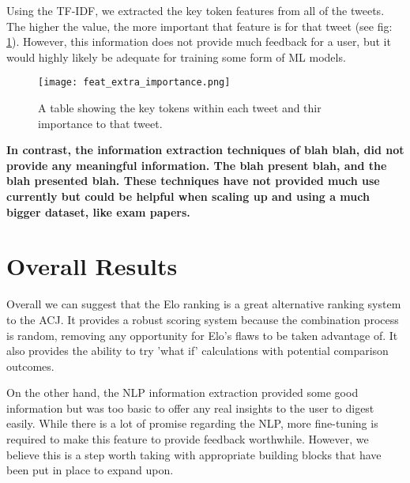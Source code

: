 	Using the TF-IDF, we extracted the key token features from all of the tweets. The higher the value, the more important that feature is for that tweet (see fig: \ref{fig:feature_extract}). However, this information does not provide much feedback for a user, but it would highly likely be adequate for training some form of ML models.

	\begin{figure}[h]
		\centering
		\texttt{[image: feat\_extra\_importance.png]}
		\caption{A table showing the key tokens within each tweet and thir importance to that tweet.}
		\label{fig:feature_extract}
		
	\end{figure}

	\textbf{In contrast, the information extraction techniques of blah blah, did not provide any meaningful information. The blah present blah, and the blah presented blah. These techniques have not provided much use currently but could be helpful when scaling up and using a much bigger dataset, like exam papers.}



\section{Overall Results}
\label{sec:reaults_NLP}

	Overall we can suggest that the Elo ranking is a great alternative ranking system to the ACJ. It provides a robust scoring system because the combination process is random, removing any opportunity for Elo's flaws to be taken advantage of. It also provides the ability to try 'what if' calculations with potential comparison outcomes.
	
	On the other hand, the NLP information extraction provided some good information but was too basic to offer any real insights to the user to digest easily. While there is a lot of promise regarding the NLP, more fine-tuning is required to make this feature to provide feedback worthwhile. However, we believe this is a step worth taking with appropriate building blocks that have been put in place to expand upon.

